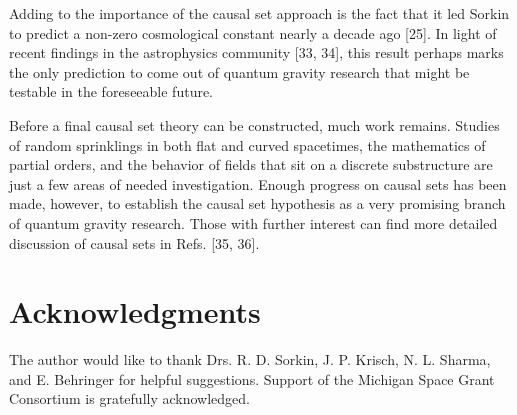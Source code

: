 Adding to the importance of the causal set approach is the fact that it led
Sorkin to predict a non-zero cosmological constant nearly a decade ago [25].
In light of recent findings in the astrophysics community [33, 34], this
result perhaps marks the only prediction to come out of quantum gravity
research that might be testable in the foreseeable future.

Before a final causal set theory can be constructed, much work remains.
Studies of random sprinklings in both flat and curved spacetimes, the
mathematics of partial orders, and the behavior of fields that sit on a
discrete substructure are just a few areas of needed investigation. Enough
progress on causal sets has been made, however, to establish the causal set
hypothesis as a very promising branch of quantum gravity research. Those
with further interest can find more detailed discussion of causal sets in
Refs. [35, 36].

\section{Acknowledgments}

The author would like to thank Drs. R. D. Sorkin, J. P. Krisch, N. L.
Sharma, and E. Behringer for helpful suggestions. Support of the Michigan
Space Grant Consortium is gratefully acknowledged.

